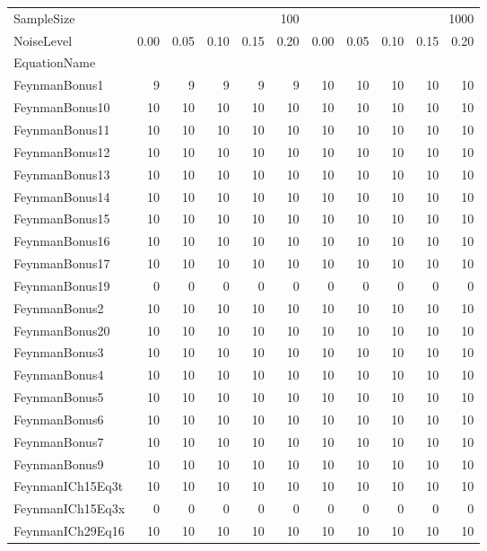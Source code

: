 \begin{tabular}{lrrrrrrrrrr}
\toprule
SampleSize & \multicolumn{5}{r}{100} & \multicolumn{5}{r}{1000} \\
NoiseLevel & 0.00 & 0.05 & 0.10 & 0.15 & 0.20 & 0.00 & 0.05 & 0.10 & 0.15 & 0.20 \\
EquationName &  &  &  &  &  &  &  &  &  &  \\
\midrule
FeynmanBonus1 & 9 & 9 & 9 & 9 & 9 & 10 & 10 & 10 & 10 & 10 \\
FeynmanBonus10 & 10 & 10 & 10 & 10 & 10 & 10 & 10 & 10 & 10 & 10 \\
FeynmanBonus11 & 10 & 10 & 10 & 10 & 10 & 10 & 10 & 10 & 10 & 10 \\
FeynmanBonus12 & 10 & 10 & 10 & 10 & 10 & 10 & 10 & 10 & 10 & 10 \\
FeynmanBonus13 & 10 & 10 & 10 & 10 & 10 & 10 & 10 & 10 & 10 & 10 \\
FeynmanBonus14 & 10 & 10 & 10 & 10 & 10 & 10 & 10 & 10 & 10 & 10 \\
FeynmanBonus15 & 10 & 10 & 10 & 10 & 10 & 10 & 10 & 10 & 10 & 10 \\
FeynmanBonus16 & 10 & 10 & 10 & 10 & 10 & 10 & 10 & 10 & 10 & 10 \\
FeynmanBonus17 & 10 & 10 & 10 & 10 & 10 & 10 & 10 & 10 & 10 & 10 \\
FeynmanBonus19 & 0 & 0 & 0 & 0 & 0 & 0 & 0 & 0 & 0 & 0 \\
FeynmanBonus2 & 10 & 10 & 10 & 10 & 10 & 10 & 10 & 10 & 10 & 10 \\
FeynmanBonus20 & 10 & 10 & 10 & 10 & 10 & 10 & 10 & 10 & 10 & 10 \\
FeynmanBonus3 & 10 & 10 & 10 & 10 & 10 & 10 & 10 & 10 & 10 & 10 \\
FeynmanBonus4 & 10 & 10 & 10 & 10 & 10 & 10 & 10 & 10 & 10 & 10 \\
FeynmanBonus5 & 10 & 10 & 10 & 10 & 10 & 10 & 10 & 10 & 10 & 10 \\
FeynmanBonus6 & 10 & 10 & 10 & 10 & 10 & 10 & 10 & 10 & 10 & 10 \\
FeynmanBonus7 & 10 & 10 & 10 & 10 & 10 & 10 & 10 & 10 & 10 & 10 \\
FeynmanBonus9 & 10 & 10 & 10 & 10 & 10 & 10 & 10 & 10 & 10 & 10 \\
FeynmanICh15Eq3t & 10 & 10 & 10 & 10 & 10 & 10 & 10 & 10 & 10 & 10 \\
FeynmanICh15Eq3x & 0 & 0 & 0 & 0 & 0 & 0 & 0 & 0 & 0 & 0 \\
FeynmanICh29Eq16 & 10 & 10 & 10 & 10 & 10 & 10 & 10 & 10 & 10 & 10 \\

\end{tabular}

